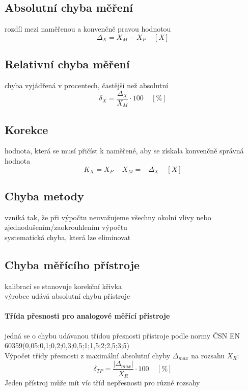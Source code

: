 \subsection*{Absolutní chyba měření}
rozdíl mezi naměřenou a konvenčně pravou hodnotou
\begin{equation}
    \Delta_X = X_M - X_P \;\;\;\; [X]
\end{equation}
\subsection*{Relativní chyba měření}
chyba vyjádřená v procentech, častější než absolutní
\begin{equation}
    \delta_X = \frac{\Delta_X}{X_M} \cdot 100\;\;\;\; [\%]
\end{equation}
\subsection*{Korekce}
hodnota, která se musí přičíst k naměřené, aby se získala konvenčně správná
hodnota
\begin{equation}
    K_X = X_P - X_M = -\Delta_X \;\;\;\; [X]
\end{equation}
\subsection*{Chyba metody}
vzniká tak, že při výpočtu neuvažujeme všechny okolní vlivy nebo
zjednodušením/zaokrouhlením výpočtu\\ systematická chyba, která lze eliminovat
\subsection*{Chyba měřícího přístroje}
kalibrací se stanovuje korekční křivka\\ výrobce udává absolutní chybu
přístroje\\ \paragraph*{Třída přesnosti pro analogové měřící přístroje} jedná
se o chybu udávanou třídou přesnosti přístroje podle normy ČSN EN
60359(0,05;0,1;0,2;0,3;0,5;1;1,5;2;2,5;3;5)\\ Výpočet třídy přesnosti z
maximální absolutní chyby $\Delta_{max}$ na rozsahu $X_R$:
\begin{equation}
    \delta_{TP} = \frac{|\Delta_{max}|}{X_R}\cdot 100 \;\;\;\; [\%]
\end{equation}
Jeden přístroj může mít víc tříd nepřesnosti pro různé rozsahy\\
